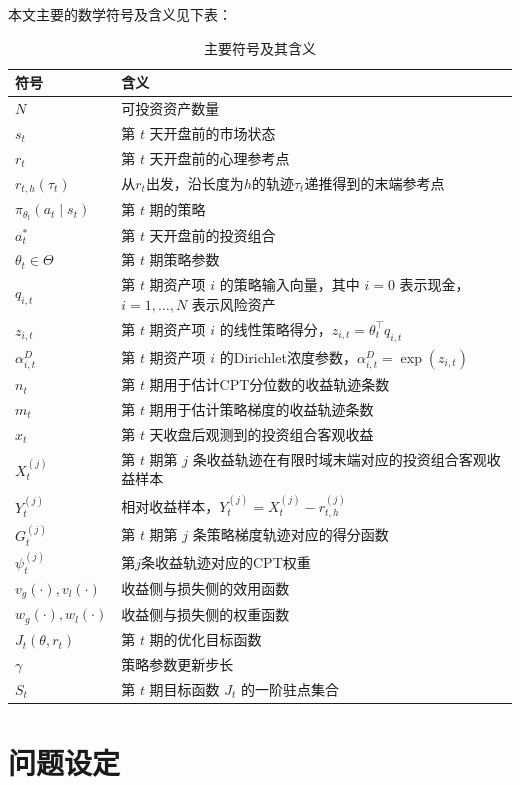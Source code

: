 本文主要的数学符号及含义见下表：
\begin{table}[H]
\centering
\caption{主要符号及其含义}
\begin{tabular}{p{} p{}}
\hline
符号 & 含义 \\
\hline
$N$ & 可投资资产数量 \\
$s_t$ & 第 $t$ 天开盘前的市场状态 \\
$r_t$ & 第 $t$ 天开盘前的心理参考点 \\
$r_{t,h}(\tau_t)$ & 从$r_t$出发，沿长度为$h$的轨迹$\tau_t$递推得到的末端参考点 \\
$\pi_{\theta_t}(a_t\mid s_t)$ & 第 $t$ 期的策略 \\
$a_{t}^*$ & 第 $t$ 天开盘前的投资组合 \\
$\theta_t \in \Theta$ & 第 $t$ 期策略参数 \\
$q_{i,t}$ & 第 $t$ 期资产项 $i$ 的策略输入向量，其中 $i=0$ 表示现金，$i=1,\dots,N$ 表示风险资产 \\
$z_{i,t}$ & 第 $t$ 期资产项 $i$ 的线性策略得分，$z_{i,t}=\theta_t^\top q_{i,t}$ \\
$\alpha^D_{i,t}$ & 第 $t$ 期资产项 $i$ 的Dirichlet浓度参数，$\alpha^D_{i,t}=\exp(z_{i,t})$ \\
$n_t$ & 第 $t$ 期用于估计CPT分位数的收益轨迹条数 \\
$m_t$ & 第 $t$ 期用于估计策略梯度的收益轨迹条数 \\
$x_t$ & 第 $t$ 天收盘后观测到的投资组合客观收益 \\
$X_t^{(j)}$ & 第 $t$ 期第 $j$ 条收益轨迹在有限时域末端对应的投资组合客观收益样本 \\
$Y_t^{(j)}$ & 相对收益样本，$Y_t^{(j)}=X_t^{(j)}-r_{t,h}^{(j)}$ \\
$G_t^{(j)}$ & 第 $t$ 期第 $j$ 条策略梯度轨迹对应的得分函数 \\
$\psi_t^{(j)}$ & 第$j$条收益轨迹对应的CPT权重 \\
$v_g(\cdot),v_l(\cdot)$ & 收益侧与损失侧的效用函数 \\
$w_g(\cdot),w_l(\cdot)$ & 收益侧与损失侧的权重函数 \\
$J_t(\theta,r_t)$ & 第 $t$ 期的优化目标函数 \\
$\gamma$ & 策略参数更新步长 \\
$S_t$ & 第 $t$ 期目标函数 $J_t$ 的一阶驻点集合 \\
\hline
\end{tabular}
\end{table}
\section{问题设定}
